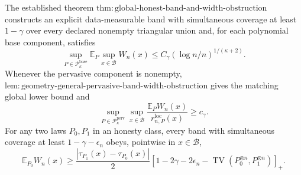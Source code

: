 The established theorem \(\mathrm{thm:global\text{-}honest\text{-}band\text{-}and\text{-}width\text{-}obstruction}\) constructs an explicit data-measurable band with simultaneous coverage at least \(1-\gamma\) over every declared nonempty triangular union and, for each polynomial base component, satisfies \[\sup_{P\in\mathcal P_{\kappa}^{\mathrm{base}}}\mathbb E_P\sup_{x\in\mathcal B}W_n(x)\le C_\gamma(\log n/n)^{1/(\kappa+2)}.\] Whenever the pervasive component is nonempty, \(\mathrm{lem:geometry\text{-}general\text{-}pervasive\text{-}band\text{-}width\text{-}obstruction}\) gives the matching global lower bound and \[\sup_{P\in\mathcal P_{\kappa}^{\mathrm{perv}}}\sup_{x\in\mathcal B}\frac{\mathbb E_PW_n(x)}{r_{n,P}^{\mathrm{loc}}(x)}\ge c_\gamma.\] For any two laws \(P_0,P_1\) in an honesty class, every band with simultaneous coverage at least \(1-\gamma-\epsilon_n\) obeys, pointwise in \(x\in\mathcal B\), \[\mathbb E_{P_0}W_n(x)\ge\frac{|\tau_{P_1}(x)-\tau_{P_0}(x)|}{2}\left[1-2\gamma-2\epsilon_n-\operatorname{TV}(P_0^{\otimes n},P_1^{\otimes n})\right]_+.\]